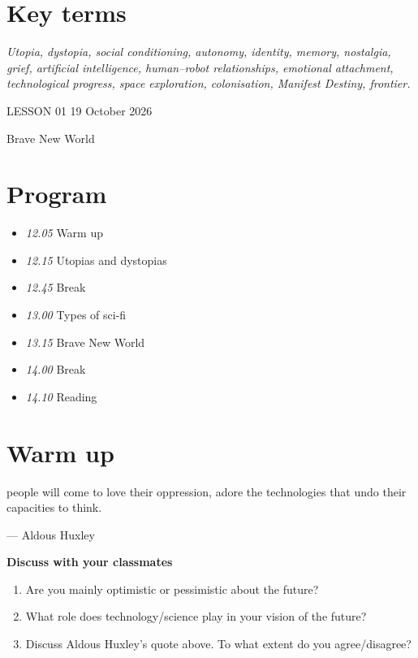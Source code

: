 \documentclass[11pt,a4paper,oneside]{book}
\newcommand{\tasktitle}[1]{{\color{blue}\bfseries #1}\par\smallskip}
\begin{document}
\section*{Key terms}
\emph{Utopia, dystopia, social conditioning, autonomy, identity, memory, nostalgia, grief, artificial intelligence, human–robot relationships, emotional attachment, technological progress, space exploration, colonisation, Manifest Destiny, frontier.}

\par\endgroup\clearpage

\clearpage{}
{\color{blue}\small LESSON 01 \hfill 19 October 2026\par}
\vspace{4mm}
{\displayfont\color{navy}\fontsize{30}{34}\selectfont Brave New World\par}\vspace{4mm}

\section*{Program}

\begin{itemize}
\item \emph{12.05} Warm up
\item \emph{12.15} Utopias and dystopias
\item \emph{12.45} Break
\item \emph{13.00} Types of sci-fi
\item \emph{13.15} Brave New World
\item \emph{14.00} Break
\item \emph{14.10} Reading
\end{itemize}

\section*{Warm up}
\begin{quotebox}
people will come to love their oppression, adore the technologies that undo their capacities to think.

— Aldous Huxley

\end{quotebox}
\begin{taskbox}
\tasktitle{Discuss with your classmates}
\begin{enumerate}
\item Are you mainly optimistic or pessimistic about the future?
\item What role does technology/science play in your vision of the future?
\item Discuss Aldous Huxley’s quote above. To what extent do you agree/disagree?
\end{enumerate}
\end{taskbox}
\end{document}
